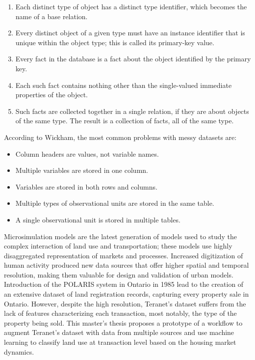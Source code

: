 \begin{enumerate}
    \item Each distinct type of object has a distinct type identifier, which becomes the name of a base relation.
    \item Every distinct object of a given type must have an instance identifier that is unique within the object type;
    this is called its primary-key value.
    \item Every fact in the database is a fact about the object identified by the primary key.
    \item Each such fact contains nothing other than the single-valued immediate properties of the object.
    \item Such facts are collected together in a single relation, if they are about objects of the same type.
    The result is a collection of facts, all of the same type.
\end{enumerate}

According to Wickham, the most common problems with messy datasets are:
\begin{itemize}
    \item Column headers are values, not variable names.
    \item Multiple variables are stored in one column.
    \item Variables are stored in both rows and columns.
    \item Multiple types of observational units are stored in the same table.
    \item A single observational unit is stored in multiple tables.
\end{itemize}



Microsimulation models are the latest generation of models used to study the complex interaction of land use and transportation;
these models use highly disaggregated representation of markets and processes.
Increased digitization of human activity produced new data sources that offer higher spatial and temporal resolution, making them valuable for design and validation of urban models.
Introduction of the POLARIS system in Ontario in 1985 lead to the creation of an extensive dataset of land registration records, capturing every property sale in Ontario.
However, despite the high resolution, Teranet's dataset suffers from the lack of features characterizing each transaction, most notably, the type of the property being sold.
This master's thesis proposes a prototype of a workflow to augment Teranet's dataset with data from multiple sources and use machine learning to classify land use at transaction level based on the housing market dynamics.


